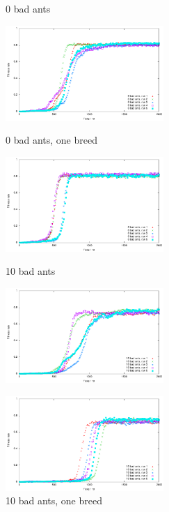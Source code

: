 \documentclass[titlepage, a4paper, 12pt]{article}
\begin{document}
\begin{figure}[H]
  \begin{minipage}[b]{0.5\linewidth}
    \centering
    \caption{0  bad ants }\label{fig:images/graph0}
    \includegraphics[width=6cm]{images/graph0.pdf}
  \end{minipage}
  \begin{minipage}[b]{0.5\linewidth}
    \centering
    \caption{0 bad ants, one breed }\label{fig:images/graph0oneBreed}
    \includegraphics[width=6cm]{images/graph0oneBreed.pdf}
  \end{minipage}
  
  \hspace{0.5cm}
  
  \begin{minipage}[b]{0.5\linewidth}
    \centering
    \caption{10 bad ants }\label{fig:images/graph10}
    \includegraphics[width=6cm]{images/graph10.pdf}
  \end{minipage}
  \begin{minipage}[b]{0.5\linewidth}
    \centering
    \caption{10 bad ants, one breed }\label{fig:images/graph10oneBreed}
    \includegraphics[width=6cm]{images/graph10oneBreed.pdf}
  \end{minipage}
  

\end{figure}
\end{document}
